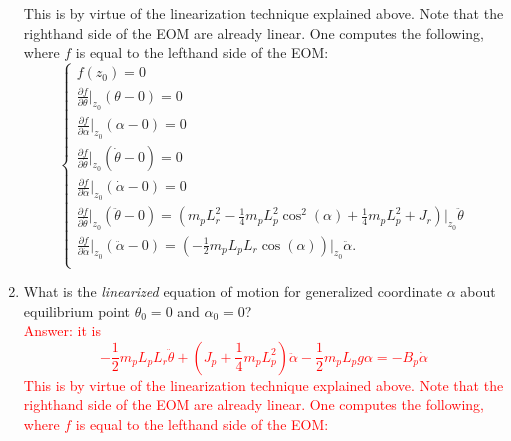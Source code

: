 \documentclass[12pt]{report}
\newcommand\drew[1]{\textcolor{red}{#1}}
\newcommand{\pder}[2]{\frac{\partial #1}{\partial #2}}
\begin{document}
\begin{enumerate}
{              This is by virtue of the linearization technique explained above. Note that the righthand side of the EOM are already linear. One computes the following, where $f$ is equal to the lefthand side of the EOM:
              \[
                  \begin{cases}
                      f(z_0) = 0                                                                                                                                                    \\
                      \pder{f}{\theta}\big|_{z_0} (\theta-0) = 0                                                                                                                    \\
                      \pder{f}{\alpha}\big|_{z_0} (\alpha-0) = 0                                                                                                                    \\
                      \pder{f}{\dot{\theta}}\big|_{z_0} (\dot{\theta}-0) = 0                                                                                                        \\
                      \pder{f}{\dot{\alpha}}\big|_{z_0} (\dot{\alpha}-0)= 0                                                                                                         \\
                      \pder{f}{\dot{\theta}}\big|_{z_0} (\ddot{\theta}-0)= \left(m_pL_r^2-\frac{1}{4}m_pL_p^2\cos^2(\alpha)+\frac{1}{4}m_pL_p^2+J_r \right)\big|_{z_0}\ddot{\theta} \\
                      \pder{f}{\dot{\alpha}}\big|_{z_0} (\ddot{\alpha}-0)= \left(-\frac{1}{2}m_pL_pL_r\cos{(\alpha)}\right)\big|_{z_0} \ddot{\alpha}.                               \\
                  \end{cases}
              \]
          }
    \item What is the \emph{linearized} equation of motion for generalized coordinate $\alpha$ about equilibrium point $\theta_0 = 0$ and $\alpha_0 = 0$?\\
          \drew{Answer: it is
              \[
                  -\frac{1}{2} m_p L_p L_r \ddot{\theta} + \left(J_p + \frac{1}{4} m_p L_{p}^{2}\right)\ddot{\alpha} - \frac{1}{2} m_p L_{p} g \alpha = - B_p \dot{\alpha}
              \]
              This is by virtue of the linearization technique explained above. Note that the righthand side of the EOM are already linear. One computes the following, where $f$ is equal to the lefthand side of the EOM:
}
\end{enumerate}
\end{document}
